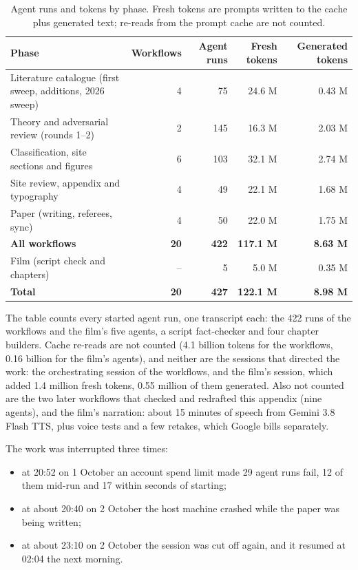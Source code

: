 \begin{table}[htbp]\centering\caption{Agent runs and tokens by phase. Fresh tokens are prompts written to the cache plus generated text; re-reads from the prompt cache are not counted.}\label{tab:making-cost}\footnotesize
\begin{tabular}{@{}p{5.4cm}rrrr@{}}\toprule\headrow \textbf{Phase} & \textbf{Workflows} & \textbf{Agent runs} & \textbf{Fresh tokens} & \textbf{Generated tokens}\\\midrule
Literature catalogue (first sweep, additions, 2026 sweep) & 4 & 75 & 24.6 M & 0.43 M\\
Theory and adversarial review (rounds 1--2) & 2 & 145 & 16.3 M & 2.03 M\\
Classification, site sections and figures & 6 & 103 & 32.1 M & 2.74 M\\
Site review, appendix and typography & 4 & 49 & 22.1 M & 1.68 M\\
Paper (writing, referees, sync) & 4 & 50 & 22.0 M & 1.75 M\\
\textbf{All workflows} & \textbf{20} & \textbf{422} & \textbf{117.1 M} & \textbf{8.63 M}\\
Film (script check and chapters) & -- & 5 & 5.0 M & 0.35 M\\
\textbf{Total} & \textbf{20} & \textbf{427} & \textbf{122.1 M} & \textbf{8.98 M}\\\bottomrule\end{tabular}\end{table}

The table counts every started agent run, one transcript each: the 422 runs of the workflows and the film's five agents, a script fact-checker and four chapter builders. Cache re-reads are not counted (4.1 billion tokens for the workflows, 0.16 billion for the film's agents), and neither are the sessions that directed the work: the orchestrating session of the workflows, and the film's session, which added 1.4 million fresh tokens, 0.55 million of them generated. Also not counted are the two later workflows that checked and redrafted this appendix (nine agents), and the film's narration: about 15 minutes of speech from Gemini 3.8 Flash TTS, plus voice tests and a few retakes, which Google bills separately.

The work was interrupted three times:

\begin{itemize}
\item at 20:52 on 1 October an account spend limit made 29 agent runs fail, 12 of them mid-run and 17 within seconds of starting;
\item at about 20:40 on 2 October the host machine crashed while the paper was being written;
\item at about 23:10 on 2 October the session was cut off again, and it resumed at 02:04 the next morning.
\end{itemize}

